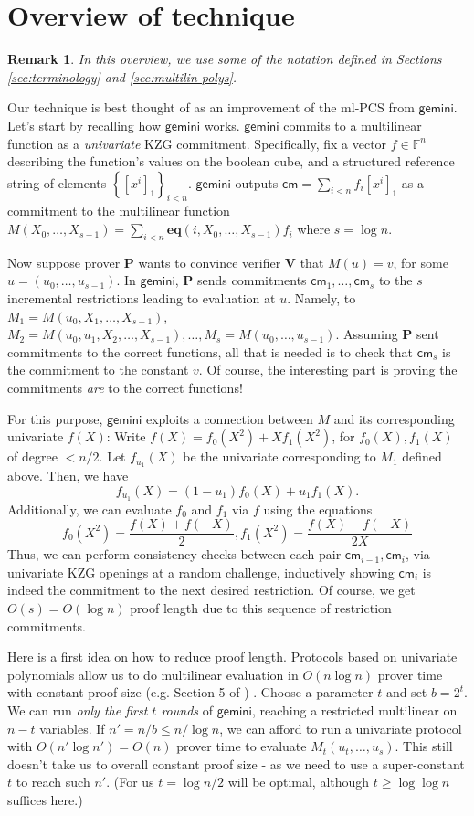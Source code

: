 \documentclass[11pt]{article} %
\newcommand{\gemini}{\ensuremath{\mathsf{gemini}}\xspace}
\newcommand{\F}{\ensuremath{\mathbb F}\xspace}
\newcommand{\cm}{\ensuremath{\mathsf{cm}}\xspace}
\newcommand{\sett}[2]{\ensuremath{\set{#1}_{#2}}\xspace}
\newcommand{\enc}[1]{\ensuremath{\left[#1\right]_1}\xspace}
\newcommand{\prv}{\ensuremath{\mathsf{\mathbf{P}}}\xspace}
\newcommand{\ver}{\ensuremath{\mathsf{\mathbf{V}}}\xspace}
\newcommand{\set}[1]{\ensuremath{\left\{#1\right\}}\xspace}
\newcommand{\sumi}[1]{\sum_{i< #1}}
\newtheorem{remark}[lemma]{Remark}
\newcommand{\eq}{\ensuremath{\mathsf{eq}}\xspace}
\renewcommand{\eq}{\ensuremath{\mathbf{eq}}\xspace}
\newcommand{\mlpcs}{ml-PCS\xspace}
\begin{document}
\section{Overview of technique}
\begin{remark}
 In this overview, we use some of the notation defined in Sections \ref{sec:terminology} and \ref{sec:multilin-polys}.
\end{remark}

Our technique is best thought of as an improvement of the \mlpcs from \gemini \cite{gemini}.
Let's start by recalling how \gemini works.
\gemini commits to a multilinear function as a \emph{univariate} KZG commitment\cite{kzg}. Specifically,
fix a vector $f\in \F^n$ describing the function's values on the boolean cube, and a structured reference string of elements \sett{\enc{x^i}}{i<n}. \gemini
outputs $\cm=\sumi{n}f_i \enc{x^i}$ as a commitment to the multilinear function $M(X_0,\ldots,X_{s-1})= \sumi{n}\eq(i,X_0,\ldots,X_{s-1}) f_i$ where $s=\log n$.


Now suppose prover \prv wants to convince verifier \ver  that $M(u)=v$, for some $u=(u_0,\ldots,u_{s-1})$. In \gemini, \prv sends commitments $\cm_1,\ldots,\cm_s$ to the $s$ incremental restrictions leading  to evaluation at $u$.
Namely, to $M_1=M(u_0,X_1,\ldots,X_{s-1})$, $M_2=M(u_0,u_1,X_2,\ldots,X_{s-1}),\ldots,M_s=M(u_0,\ldots,u_{s-1})$.
Assuming \prv sent commitments to the correct functions, all that is needed is to check that $\cm_s$ is the commitment to the constant $v$. Of course, the interesting part is proving the commitments \emph{are} to the correct functions!

For this purpose, \gemini exploits a connection between $M$ and its corresponding univariate $f(X)$:
Write $f(X)=f_0(X^2)+X f_1(X^2)$, for $f_0(X),f_1(X)$ of degree $<n/2$. Let $f_{u_1}(X)$ be the univariate corresponding to $M_1$ defined above. Then, we have
\[f_{u_1}(X)=(1-u_1)f_0(X)+ u_1 f_1(X).\]
Additionally, we can evaluate $f_0$ and $f_1$ via $f$  using the equations
\[f_0(X^2)=\frac{f(X)+f(-X)}{2}, f_1(X^2)=\frac{f(X)-f(-X)}{2X}\]
Thus, we can perform consistency checks between each pair $\cm_{i-1},\cm_i$, via univariate KZG openings at a random challenge, inductively showing $\cm_i$ is indeed the commitment to the next desired restriction.
Of course, we get $O(s)=O(\log n)$ proof length due to this sequence of restriction commitments.

Here is a first idea on how to reduce proof length.
Protocols based on univariate polynomials allow us to do multilinear evaluation in $O(n\log n)$ prover time with constant proof size (e.g. Section 5 of \cite{logupgkr}) .
Choose a parameter $t$ and set $b=2^t$.
We can run \emph{only the first $t$ rounds} of \gemini, reaching a restricted multilinear on $n-t$ variables.
If $n'=n/b\leq n/\log n$, we can afford to run a univariate protocol with $O(n' \log n')=O(n)$ prover time to evaluate $M_t(u_t,\ldots,u_s)$.
This still doesn't take us to overall constant proof size - as we  need to use a super-constant $t$ to reach such $n'$. (For us $t=\log n/2$ will be optimal, although $t\geq \log \log n$ suffices here.)
\end{document}
